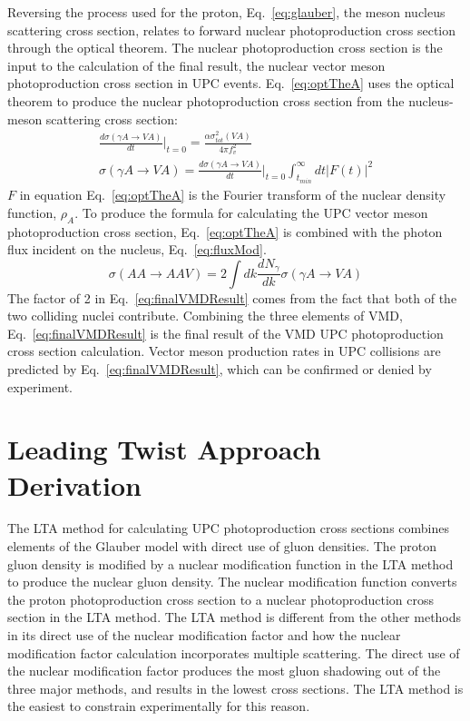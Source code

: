     Reversing the process used for the proton, Eq.~\ref{eq:glauber}, the meson 
      nucleus scattering cross section, relates to forward nuclear 
      photoproduction cross section through the optical theorem. 
    The nuclear photoproduction cross section is the input to the calculation 
      of the final result, the nuclear vector meson photoproduction cross 
      section in UPC events.  
    Eq.~\ref{eq:optTheA} uses the optical theorem to produce the nuclear 
      photoproduction cross section from the nucleus-meson scattering cross 
      section:
    \begin{eqnarray} \label{eq:optTheA}
      \frac{d\sigma(\gamma A\rightarrow VA)}{dt}\Big|_{t=0}=
      \frac{\alpha\sigma_{tot}^{2}(VA)}{4\pi f_{v}^{2}}\nonumber \\
      \sigma(\gamma A\rightarrow VA)=\frac{d\sigma(\gamma A\rightarrow VA)}{dt}
        \Big|_{t=0}\int_{t_{min}}^{\infty}dt|F(t)|^{2}
    \end{eqnarray}
    $F$ in equation Eq.~\ref{eq:optTheA} is the Fourier transform of the 
      nuclear density function, $\rho_{A}$.
    To produce the formula for calculating the UPC vector meson 
      photoproduction cross section, Eq.~\ref{eq:optTheA} is combined with the 
      photon flux incident on the nucleus, Eq.~\ref{eq:fluxMod}. 
    \begin{equation} \label{eq:finalVMDResult}
      \sigma(AA\rightarrow AAV)=2\int{dk\frac{dN_{\gamma}}{dk}
                    \sigma(\gamma A\rightarrow VA)}
    \end{equation}
    The factor of 2 in Eq.~\ref{eq:finalVMDResult} comes from the fact that both 
      of the two colliding nuclei contribute. 
    Combining the three elements of VMD, Eq.~\ref{eq:finalVMDResult} is the 
      final result of the VMD UPC photoproduction cross section calculation. 
    Vector meson production rates in UPC collisions are predicted 
      by Eq.~\ref{eq:finalVMDResult}, which can be confirmed or denied by 
      experiment. 


      \section{\label{sec:ltaTheory}Leading Twist Approach Derivation}
    The LTA method for calculating UPC photoproduction cross sections
      combines elements of the Glauber model with direct use of gluon 
      densities. 
    The proton gluon density is modified by a nuclear modification 
      function in the LTA method to produce the nuclear gluon density. 
    The nuclear modification function converts the proton photoproduction
      cross section to a nuclear photoproduction cross section in the LTA 
      method.
    The LTA method is different from the other methods in its direct use of the
       nuclear modification factor and how the nuclear modification factor
       calculation incorporates multiple scattering.
    The direct use of the nuclear modification factor produces the most gluon 
      shadowing out of the three major methods, and results in the lowest
      cross sections.
    The LTA method is the easiest to constrain experimentally for this reason. 

